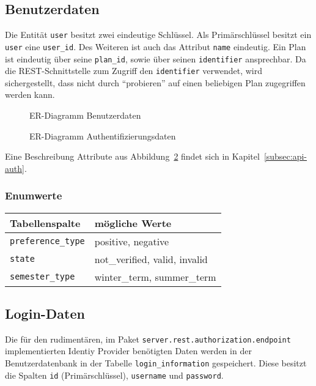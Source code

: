 \subsection{Benutzerdaten}
Die Entität \texttt{user} besitzt zwei eindeutige Schlüssel. Als Primärschlüssel besitzt ein \texttt{user} eine \texttt{user\_id}. Des Weiteren ist auch das Attribut \texttt{name} eindeutig.
Ein Plan ist eindeutig über seine \texttt{plan\_id}, sowie über seinen \texttt{identifier} ansprechbar. Da die REST-Schnittstelle zum Zugriff den \texttt{identifier} verwendet, wird sichergestellt, dass nicht durch \enquote{probieren} auf einen beliebigen Plan zugegriffen werden kann.
\begin{figure}[H]
	
	\caption{ER-Diagramm Benutzerdaten}
	\label{fig:user-er}
\end{figure}
\begin{figure}[H]
	
	\caption{ER-Diagramm Authentifizierungsdaten}
	\label{fig:auth-er}
\end{figure}

Eine Beschreibung Attribute aus Abbildung~\ref{fig:auth-er} findet sich in Kapitel~\ref{subsec:api-auth}.
\subsubsection{Enumwerte}
\begin{table}[h]
	\begin{tabular}{|l|l|}
		\hline
		\textbf{Tabellenspalte} & \textbf{mögliche Werte} \\ \hline
		\texttt{preference\_type} & positive, negative \\ \hline
		\texttt{state} & not\_verified, valid, invalid \\ \hline
		\texttt{semester\_type} & winter\_term, summer\_term \\ \hline
	\end{tabular}
\end{table}

\subsection{Login-Daten}
Die für den rudimentären, im Paket \texttt{server.rest.authorization.endpoint} implementierten Identiy Provider benötigten Daten werden in der Benutzerdatenbank in der Tabelle \texttt{login\_information} gespeichert. Diese besitzt die Spalten \texttt{id} (Primärschlüssel), \texttt{username} und \texttt{password}.